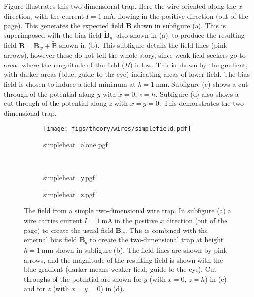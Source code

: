 Figure  illustrates this two-dimensional trap.
Here the wire oriented along the $x$ direction, with the current
$I=\SI{1}{\milli\ampere}$, flowing in the
positive direction (out of the page). This generates the expected field
$\mathbf{B}$ shown in subfigure (a). This is superimposed with the bias field
$\mathbf{\tilde{B}}_y$, also shown in (a), to produce the resulting field
$\mathbf{B} = \mathbf{B}_w + \mathbf{\tilde{B}}$ shown
in (b). This subfigure details the field lines (pink arrows), however these do
not tell the whole story, since weak-field seekers go to areas where the
magnitude of the field ($B$) is low. This is shown by the gradient, with darker
areas (blue, guide to the eye) indicating areas of lower field. The bias field
is chosen to induce a field minimum at $h=\SI{1}{\milli\meter}$. Subfigure (c)
shows a cut-through of the potential along $y$ with $x=0$, $z=h$. Subfigure (d)
also shows a cut-through of the potential along $z$ with $x=y=0$. This
demonstrates the two-dimensional trap.

\begin{figure}[htbp]
  \centering
  \begin{subfigure}[b]{0.45\textwidth}
    \centering
    \hfill{}
    \texttt{[image: figs/theory/wires/simplefield.pdf]}
    \hfill{}
  \end{subfigure}
  \begin{subfigure}[b]{0.45\textwidth}
    \centering
    {simpleheat_alone.pgf}
  \end{subfigure} \\
  \begin{subfigure}[b]{0.45\textwidth}
    \centering
    {simpleheat_y.pgf}
  \end{subfigure}
  \begin{subfigure}[b]{0.45\textwidth}
    \centering
    {simpleheat_z.pgf}
  \end{subfigure}
  \caption{
    The field from a simple two-dimensional wire trap. In subfigure (a) a wire carries
    current $I=\SI{1}{\milli\ampere}$ in the positive $x$ direction (out of the
    page) to create the usual field $\mathbf{B}_w$. This is combined with the
    external bias field $\mathbf{\tilde{B}}_y$ to create the two-dimensional trap
    at height $h=\SI{1}{\milli\meter}$
    shown in subfigure (b). The field lines are shown by pink arrows, and the
    magnitude of the resulting field is shown with the blue gradient (darker
    means weaker field, guide to the eye). Cut throughs of the potential are
    shown for $y$ (with $x=0$, $z=h$) in (c) and for $z$ (with $x = y = 0$) in
    (d).
  }
  \label{theory:fig:simplefield}
\end{figure}

